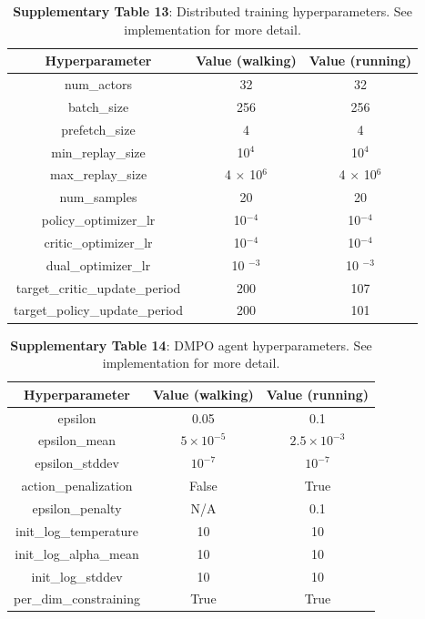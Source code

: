 \documentclass[sn-mathphys-num]{sn-jnl}%
\theoremstyle{thmstyleone}	%
\theoremstyle{thmstyletwo}	%
\theoremstyle{thmstylethree}	%
\begin{document}
\begin{appendices}
\begin{table}[htbp]
	\centering
	\small
	\caption{\textbf{Supplementary Table 13}: 
		Distributed training hyperparameters. 
		See implementation for more detail.
	}
	\begin{tabular}{ccc}
		\toprule
		\textbf{Hyperparameter}        &        \textbf{Value (walking)}  & \textbf{Value (running)}   \\
		\midrule
		num\_actors     &  32     &  32 \\
		batch\_size     &  256     &  256 \\
		prefetch\_size     &  4     &  4 \\
		min\_replay\_size     &  10$ ^4 $     & 10$ ^4 $ \\
		max\_replay\_size     & 4 $ \times $ 10$ ^6 $     & 4 $ \times $ 10$ ^6 $  \\
		num\_samples     &   20    &  20 \\
		policy\_optimizer\_lr     &   10$ ^{-4} $    &  10$ ^{-4} $ \\
		critic\_optimizer\_lr     &   10$ ^{-4} $    &  10$ ^{-4} $ \\
		dual\_optimizer\_lr     &   10 $ ^{-3} $    &  10 $ ^{-3} $ \\
		target\_critic\_update\_period     &   200    &  107 \\
		target\_policy\_update\_period     &   200    &  101 \\
		\bottomrule
	\end{tabular}%
	\label{tab:s_13}%
\end{table}%



\begin{table}[htbp]
	\centering
	\small
	\caption{\textbf{Supplementary Table 14}: 
		DMPO agent hyperparameters. 
		See implementation for more detail.
	}
	\begin{tabular}{ccc}
		\toprule
		\textbf{Hyperparameter}        &        \textbf{Value (walking)}  & \textbf{Value (running)}   \\
		\midrule
		epsilon     &  0.05     &  0.1 \\
		epsilon\_mean     &  $ 5 \times 10^{-5} $     &  $ 2.5 \times 10 ^{-3} $ \\
		epsilon\_stddev     &  $ 10^{-7} $     &  $ 10^{-7} $ \\
		action\_penalization     &  False     &  True \\
		epsilon\_penalty     &  N/A     &  0.1 \\
		init\_log\_temperature     &  10     &  10 \\
		init\_log\_alpha\_mean     &  10     &  10 \\
		init\_log\_stddev     &  10     &  10 \\
		per\_dim\_constraining     &  True     &  True \\
		\bottomrule
	\end{tabular}%
	\label{tab:s_14}%
\end{table}%



\end{appendices}
\end{document}
